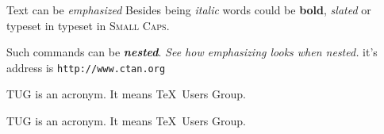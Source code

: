 \documentclass{article}
\begin{document}
Text can be \emph{emphasized}
Besides being \textit{italic} words could be \textbf{bold}, \textsl{slated} or typeset in typeset in \textsc{Small Caps}.

Such commands can be \textit{\textbf{nested}}.
\emph{See how \emph{emphasizing} looks when nested.}
it's address is \texttt{http://www.ctan.org}
\parbox{3cm}{TUG is an acronym. It means \TeX\ Users Group.}
\parbox{1cm}{TUG is an acronym. It means \TeX\ Users Group.}
\end{document}
